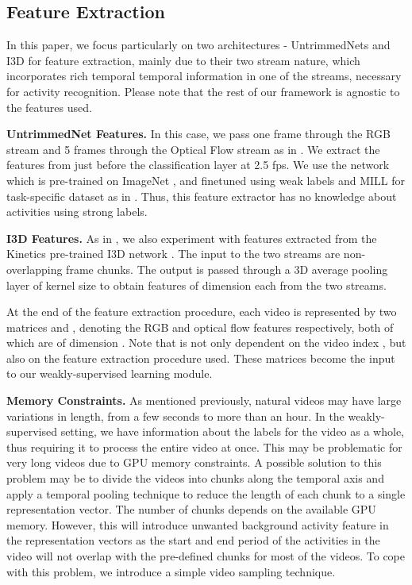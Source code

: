 \documentclass[runningheads]{llncs}
\begin{document}
\subsection{Feature Extraction}
\label{feature}
In this paper, we focus particularly on two architectures - UntrimmedNets \cite{wang2017untrimmednets} and I3D \cite{carreira2017quo} for feature extraction, mainly due to their two stream nature, which incorporates rich temporal temporal information in one of the streams, necessary for activity recognition. Please note that the rest of our framework is agnostic to the features used.

\textbf{UntrimmedNet Features.} In this case, we pass one frame through the RGB stream and 5 frames through the Optical Flow stream as in \cite{wang2017untrimmednets}. We extract the features from just before the classification layer at 2.5 fps. We use the network which is pre-trained on ImageNet \cite{deng2009imagenet}, and finetuned using weak labels and MILL for task-specific dataset as in \cite{wang2017untrimmednets}. Thus, this feature extractor has no knowledge about activities using strong labels. 

\textbf{I3D Features.} As in \cite{nguyen2017weakly}, we also experiment with features extracted from the Kinetics pre-trained I3D network \cite{carreira2017quo}. The input to the two streams are non-overlapping  frame chunks. The output is passed through a 3D average pooling layer of kernel size  to obtain features of dimension  each from the two streams. 

At the end of the feature extraction procedure, each video  is represented by two matrices  and , denoting the RGB and optical flow features respectively, both of which are of dimension . Note that  is not only dependent on the video index , but also on the feature extraction procedure used. These matrices become the input to our weakly-supervised learning module.

\textbf{Memory Constraints.} As mentioned previously, natural videos may have large variations in length, from a few seconds to more than an hour. In the weakly-supervised setting, we have information about the labels for the video as a whole, thus requiring it to process the entire video at once. This may be problematic for very long videos due to GPU memory constraints. A possible solution to this problem may be to divide the videos into chunks along the temporal axis \cite{wang2016temporal} and apply a temporal pooling technique to reduce the length of each chunk to a single representation vector. The number of chunks depends on the available GPU memory. However, this will introduce unwanted background activity feature in the representation vectors as the start and end period of the activities in the video will not overlap with the pre-defined chunks for most of the videos. To cope with this problem, we introduce a simple video sampling technique.
\end{document}
